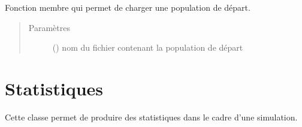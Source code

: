 \documentclass[letterpaper,10pt,french]{sphinxmanual}
\begin{document}
\begin{fulllineitems}
\begin{fulllineitems}
Fonction membre qui permet de charger une population de départ.
\begin{quote}\begin{description}
\item[{Paramètres}] \leavevmode
{} () \textendash{} nom du fichier contenant la population de départ

\end{description}\end{quote}

\end{fulllineitems}


\end{fulllineitems}



\section{Statistiques}
\label{\detokenize{code:statistiques}}
Cette classe permet de produire des statistiques dans le cadre d’une simulation.
\end{document}
